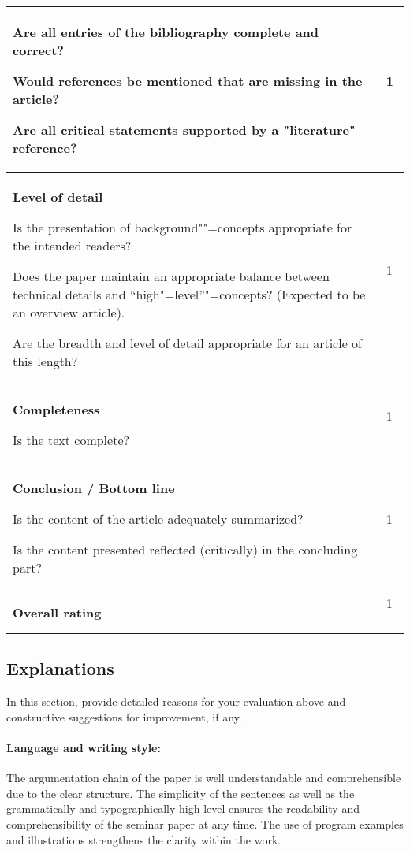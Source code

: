 \documentclass[12pt]{scrartcl}
\begin{document}
\begin{longtable}{|p{12cm}|p{2.5cm}|}
				Are all entries of the bibliography complete and correct?
				
				Would references be mentioned that are missing in the article?
				
				Are all critical statements supported by a "literature" reference?
			& 1 \ \\				
		\hline
			\textbf{Level of detail}
			
				Is the presentation of background""=concepts appropriate for the intended readers?
				
				Does the paper maintain an appropriate balance between technical details and "`high"=level"'"=concepts? (Expected to be an overview article).
				
				Are the breadth and level of detail appropriate for an article of this length?
			& 1 \ \\				
		\hline
			\textbf{Completeness}
			
				Is the text complete?			
			& 1 \ \\	
		\hline
			\textbf{Conclusion / Bottom line}
			
				  Is the content of the article adequately summarized?
				
				Is the content presented reflected (critically) in the concluding part?			
			& 1 \ \\				
		\hline
			\textbf{Overall rating}
			& 1 \ \\				
		\hline		
		
\end{longtable}



\subsection*{Explanations}
In this section, provide detailed reasons for your evaluation above and constructive suggestions for improvement, if any.

\paragraph{Language and writing style:} The argumentation chain of the paper is well understandable and comprehensible due to the clear structure. The simplicity of the sentences as well as the grammatically and typographically high level ensures the readability and comprehensibility of the seminar paper at any time. 
The use of program examples and illustrations strengthens the clarity within the work. 
\end{document}
